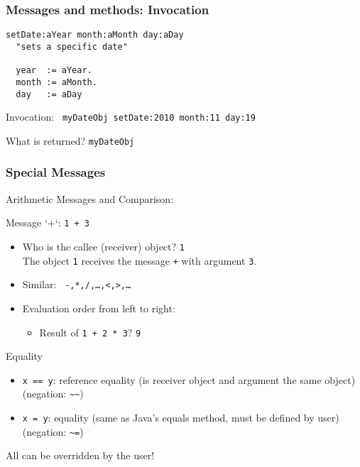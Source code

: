 \documentclass{beamer}
\newcommand{\Blue}[1]{\color{blue}#1\color{black}}
\begin{document}

\begin{frame}[fragile]
\frametitle{Messages and methods: Invocation}

\begin{example}
\begin{lstlisting}[language=Smalltalk]
setDate:aYear month:aMonth day:aDay 
  "sets a specific date"

  year  := aYear.
  month := aMonth.
  day   := aDay
\end{lstlisting}
\end{example}

Invocation:
\lstinline[language=Smalltalk]+ myDateObj setDate:2010 month:11 day:19+

\pause\bigskip

What is returned? \pause \texttt{myDateObj}

\end{frame}


\begin{frame}[fragile]
\frametitle{Special Messages}


\Blue{Arithmetic Messages and Comparison}:

Message `+`: \texttt{1 + 3}

\begin{itemize}
\item Who is the callee (receiver) object? \pause \texttt{1}\\
  The object \texttt{1} receives the message \texttt{+} with argument \texttt{3}.
\item Similar: \texttt{ -,*,/,\ldots,<,>,\ldots}
\item Evaluation order from left to right:
  \begin{itemize}
    \item Result of \texttt{1 + 2 * 3}? \pause \alert{\texttt{9}}
  \end{itemize}
\end{itemize}

\Blue{Equality}

\begin{itemize}
\item \texttt{x == y}: reference equality (is receiver object and
  argument the same object) (negation: \verb+~~+)
\item \texttt{x = y}: equality (same as Java's equals method, must be
  defined by user) (negation: \verb+~=+)
\end{itemize}
\pause

All can be overridden by the user!

\end{frame}
\end{document}
